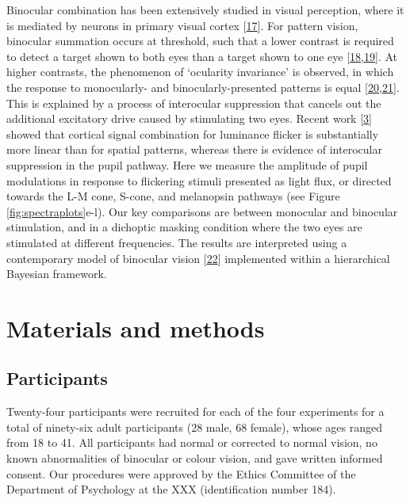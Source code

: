 \documentclass[
]{article}
\begin{document}
Binocular combination has been extensively studied in visual perception, where it is mediated by neurons in primary visual cortex {[}\protect\hyperlink{ref-Hubel1962}{17}{]}. For pattern vision, binocular summation occurs at threshold, such that a lower contrast is required to detect a target shown to both eyes than a target shown to one eye {[}\protect\hyperlink{ref-Baker2018}{18},\protect\hyperlink{ref-Campbell1965}{19}{]}. At higher contrasts, the phenomenon of `ocularity invariance' is observed, in which the response to monocularly- and binocularly-presented patterns is equal {[}\protect\hyperlink{ref-Baker2007}{20},\protect\hyperlink{ref-Moradi2009}{21}{]}. This is explained by a process of interocular suppression that cancels out the additional excitatory drive caused by stimulating two eyes. Recent work {[}\protect\hyperlink{ref-Segala2023}{3}{]} showed that cortical signal combination for luminance flicker is substantially more linear than for spatial patterns, whereas there is evidence of interocular suppression in the pupil pathway. Here we measure the amplitude of pupil modulations in response to flickering stimuli presented as light flux, or directed towards the L-M cone, S-cone, and melanopsin pathways (see Figure \ref{fig:spectraplots}e-l). Our key comparisons are between monocular and binocular stimulation, and in a dichoptic masking condition where the two eyes are stimulated at different frequencies. The results are interpreted using a contemporary model of binocular vision {[}\protect\hyperlink{ref-Meese2006}{22}{]} implemented within a hierarchical Bayesian framework.

\hypertarget{materials-and-methods}{%
\section{Materials and methods}\label{materials-and-methods}}

\hypertarget{participants}{%
\subsection{Participants}\label{participants}}

Twenty-four participants were recruited for each of the four experiments for a total of ninety-six adult participants (28 male, 68 female), whose ages ranged from 18 to 41. All participants had normal or corrected to normal vision, no known abnormalities of binocular or colour vision, and gave written informed consent. Our procedures were approved by the Ethics Committee of the Department of Psychology at the XXX (identification number 184).
\end{document}
